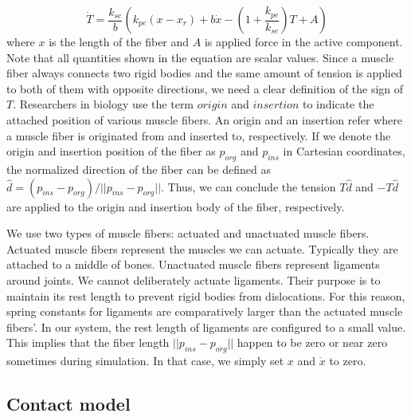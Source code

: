 \documentclass[a4paper,10pt]{article}
\begin{document}
\begin{equation}\label{Tension}
\dot{T} = \frac{k_{se}}{b} \left( k_{pe}(x-x_{r})+b\dot{x}-\left(1+\frac{k_{pe}}{k_{se}}\right)T+A   \right)
\end{equation}
where $x$ is the length of the fiber and $A$ is applied force in the active
component. Note that all quantities shown in the equation are scalar values.
Since a muscle fiber always connects two rigid bodies and the same amount of
tension is applied to both of them with opposite directions,
we need a clear definition of the sign of $T$. Researchers in biology
use the term $origin$ and $insertion$ to indicate the attached position
of various muscle fibers. An origin and an insertion refer where a muscle
fiber is originated from and inserted to, respectively.
If we denote the origin and insertion position of the fiber
as $p_{org}$ and $p_{ins}$ in Cartesian coordinates, the normalized direction of the fiber can be
defined as $\hat{d}=(p_{ins}-p_{org})/||p_{ins}-p_{org}||$. Thus, we can conclude
the tension $T\hat{d}$ and $-T\hat{d}$ are applied to the origin and insertion body
of the fiber, respectively.

We use two types of muscle fibers: actuated and unactuated muscle fibers.
Actuated muscle fibers represent the muscles we can actuate. Typically
they are attached to a middle of bones. Unactuated muscle fibers represent
ligaments around joints. We cannot deliberately actuate ligaments. Their
purpose is to maintain its rest length to prevent rigid bodies from
dislocations. For this reason, spring constants for ligaments are
comparatively larger than the actuated muscle fibers'.
In our system, the rest length of ligaments are configured to a small value.
This implies that the fiber length $||p_{ins}-p_{org}||$ happen to be zero
or near zero sometimes during simulation. In that case, we simply set
$x$ and $\dot{x}$ to zero.

\subsection{Contact model}
\end{document}
